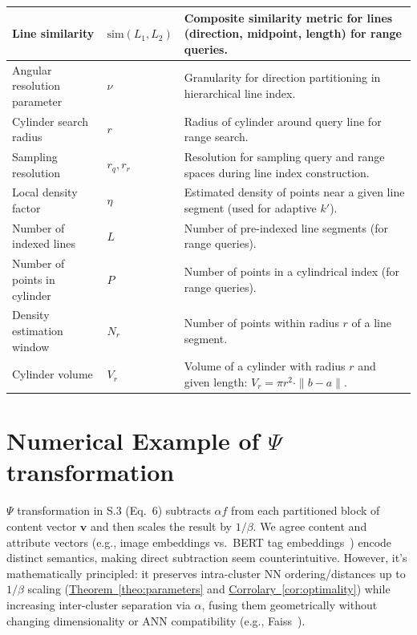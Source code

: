 \documentclass[numbers,sort]{article}
\begin{document}
\begin{longtable}{p{3.5cm} p{1.5cm} p{7.8cm}}
\midrule
Line similarity & $\text{sim}(L_1, L_2)$ & Composite similarity metric for lines (direction, midpoint, length) for range queries. \\
\midrule
Angular resolution parameter & $\nu$ & Granularity for direction partitioning in hierarchical line index. \\
\midrule
Cylinder search radius & $r$ & Radius of cylinder around query line for range search. \\
\midrule
Sampling resolution & $r_q, r_r$ & Resolution for sampling query and range spaces during line index construction. \\
\midrule
Local density factor & $\eta$ & Estimated density of points near a given line segment (used for adaptive $k'$). \\
\midrule
Number of indexed lines & $L$ & Number of pre-indexed line segments (for range queries). \\
\midrule
Number of points in cylinder & $P$ & Number of points in a cylindrical index (for range queries). \\
\midrule
Density estimation window & $N_r$ & Number of points within radius $r$ of a line segment. \\
\midrule
Cylinder volume & $V_r$ & Volume of a cylinder with radius $r$ and given length: $V_r = \pi r^2 \cdot \|b-a\|$. \\

\end{longtable}

\section{Numerical Example of $\Psi$ transformation}
\label{sec:numerical-example}

$\Psi$ transformation in S.3 (Eq.~6) subtracts $\alpha f$ from each partitioned block of content vector $\mathbf{v}$ and then scales the result by $1/\beta$. We agree content and attribute vectors (e.g., image embeddings vs.\ BERT tag embeddings~\citep{devlin2019bert}) encode distinct semantics, making direct subtraction seem counterintuitive. However, it's mathematically principled: it preserves intra-cluster NN ordering/distances up to $1/\beta$ scaling (\hyperref[theo:parameters]{Theorem~\ref*{theo:parameters}} and \hyperref[cor:optimality]{Corrolary~\ref*{cor:optimality}}) while increasing inter-cluster separation via $\alpha$, fusing them geometrically without changing dimensionality or ANN compatibility (e.g., Faiss~\cite{douze2024faiss}).
\end{document}
